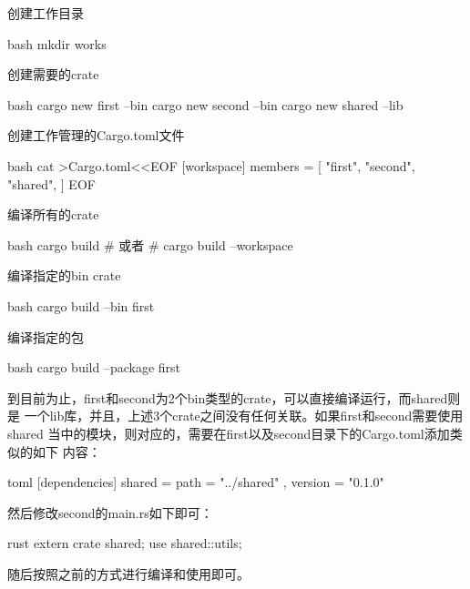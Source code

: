 \begin{outline}[enumerate]
\1 创建工作目录
\begin{code-block}{bash}
mkdir works
\end{code-block}

\1 创建需要的crate
\begin{code-block}{bash}
cargo new first --bin
cargo new second --bin
cargo new shared --lib
\end{code-block}

\1 创建工作管理的Cargo.toml文件
\begin{code-block}{bash}
cat >Cargo.toml<<EOF
[workspace]
members = [
    "first",
    "second",
    "shared",
]
EOF
\end{code-block}

\1 编译所有的crate
\begin{code-block}{bash}
cargo build
# 或者
# cargo build --workspace
\end{code-block}

\1 编译指定的bin crate
\begin{code-block}{bash}
cargo build --bin first
\end{code-block}

\1 编译指定的包
\begin{code-block}{bash}
cargo build --package first
\end{code-block}
\end{outline}

到目前为止，first和second为2个bin类型的crate，可以直接编译运行，而shared则是
一个lib库，并且，上述3个crate之间没有任何关联。如果first和second需要使用shared
当中的模块，则对应的，需要在first以及second目录下的Cargo.toml添加类似的如下
内容：
\begin{code-block}{toml}
[dependencies]
shared = { path = "../shared" , version = "0.1.0"}
\end{code-block}

然后修改second的main.rs如下即可：
\begin{code-block}{rust}
extern crate shared;
use shared::utils;
\end{code-block}
随后按照之前的方式进行编译和使用即可。

